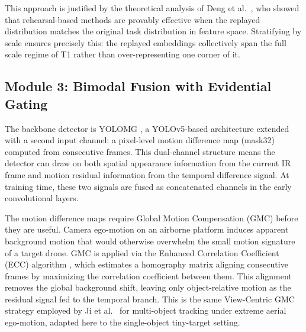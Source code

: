 This approach is justified by the theoretical analysis of Deng et al.\ \cite{deng_unlocking_2025}, who showed that rehearsal-based methods are provably effective when the replayed distribution matches the original task distribution in feature space. Stratifying by scale ensures precisely this: the replayed embeddings collectively span the full scale regime of T1 rather than over-representing one corner of it.

\subsection{Module 3: Bimodal Fusion with Evidential Gating}
\label{sec:fusion}

The backbone detector is YOLOMG \cite{guo_yolomg_2025}, a YOLOv5-based architecture extended with a second input channel: a pixel-level motion difference map (mask32) computed from consecutive frames. This dual-channel structure means the detector can draw on both spatial appearance information from the current IR frame and motion residual information from the temporal difference signal. At training time, these two signals are fused as concatenated channels in the early convolutional layers.

The motion difference maps require Global Motion Compensation (GMC) before they are useful. Camera ego-motion on an airborne platform induces apparent background motion that would otherwise overwhelm the small motion signature of a target drone. GMC is applied via the Enhanced Correlation Coefficient (ECC) algorithm \cite{evangelidis2008parametric}, which estimates a homography matrix aligning consecutive frames by maximizing the correlation coefficient between them. This alignment removes the global background shift, leaving only object-relative motion as the residual signal fed to the temporal branch. This is the same View-Centric GMC strategy employed by Ji et al.\ \cite{ji2026viewcentric} for multi-object tracking under extreme aerial ego-motion, adapted here to the single-object tiny-target setting.

